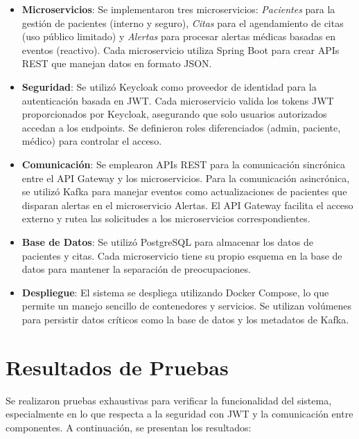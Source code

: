 \documentclass{article}
\begin{document}
\begin{itemize}
    \item \textbf{Microservicios}: Se implementaron tres microservicios: \textit{Pacientes} para la gestión de pacientes (interno y seguro), \textit{Citas} para el agendamiento de citas (uso público limitado) y \textit{Alertas} para procesar alertas médicas basadas en eventos (reactivo). Cada microservicio utiliza Spring Boot para crear APIs REST que manejan datos en formato JSON.
    \item \textbf{Seguridad}: Se utilizó Keycloak como proveedor de identidad para la autenticación basada en JWT. Cada microservicio valida los tokens JWT proporcionados por Keycloak, asegurando que solo usuarios autorizados accedan a los endpoints. Se definieron roles diferenciados (admin, paciente, médico) para controlar el acceso.
    \item \textbf{Comunicación}: Se emplearon APIs REST para la comunicación sincrónica entre el API Gateway y los microservicios. Para la comunicación asincrónica, se utilizó Kafka para manejar eventos como actualizaciones de pacientes que disparan alertas en el microservicio Alertas. El API Gateway facilita el acceso externo y rutea las solicitudes a los microservicios correspondientes.
    \item \textbf{Base de Datos}: Se utilizó PostgreSQL para almacenar los datos de pacientes y citas. Cada microservicio tiene su propio esquema en la base de datos para mantener la separación de preocupaciones.
    \item \textbf{Despliegue}: El sistema se despliega utilizando Docker Compose, lo que permite un manejo sencillo de contenedores y servicios. Se utilizan volúmenes para persistir datos críticos como la base de datos y los metadatos de Kafka.
\end{itemize}

\section{Resultados de Pruebas}
Se realizaron pruebas exhaustivas para verificar la funcionalidad del sistema, especialmente en lo que respecta a la seguridad con JWT y la comunicación entre componentes. A continuación, se presentan los resultados:
\end{document}
